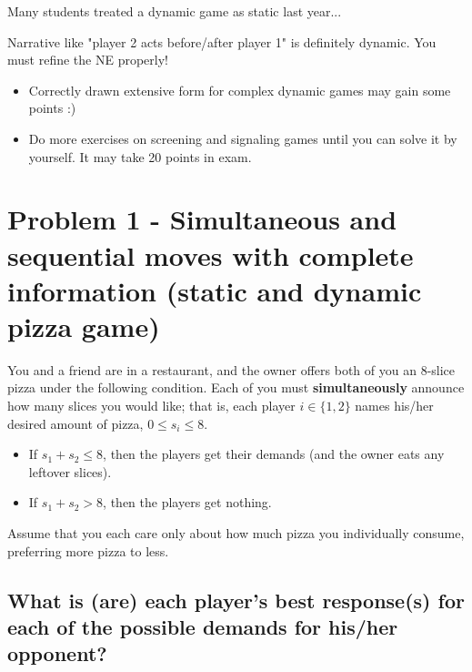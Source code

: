 \documentclass{article}
\begin{document}
\begin{mdframed}[backgroundcolor=yellow!20,linecolor=white]
Many students treated a dynamic game as static last year...

Narrative like "player 2 acts before/after player 1" is definitely dynamic. You must refine the NE properly! 

\begin{itemize}
\item Correctly drawn extensive form for complex dynamic games may gain some points :)
\item Do more exercises on screening and signaling games until you can solve it by yourself. It may take 20 points in exam.
\end{itemize}
\end{mdframed}

\newpage
\section{Problem 1 - Simultaneous and sequential moves with complete information (static and dynamic pizza game)}


You and a friend are in a restaurant, and the owner offers both of you an 8-slice pizza under
the following condition. Each of you must \textbf{simultaneously} announce how many slices you would
like; that is, each player $i \in \{1, 2\}$ names his/her desired amount of pizza, $0 \leq s_i
\leq 8$. 

\begin{itemize}
\item If $s_1 + s_2 \leq 8$, then the players get their demands (and the owner eats any leftover slices). 
\item If $s_1 + s_2 > 8$, then the players get nothing. 
\end{itemize}

Assume that you each care
only about how much pizza you individually consume, preferring more pizza to less.


\subsection{What is (are) each player's best response(s) for each of the possible demands for his/her
opponent?}
\label{subsec:br}
\end{document}
